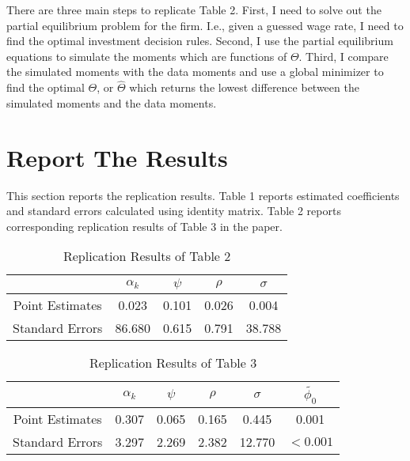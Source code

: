 \documentclass[letterpaper,12pt]{article}
\theoremstyle{definition}
\begin{document}
There are three main steps to replicate Table 2. First, I need to solve out the partial equilibrium problem for the firm. I.e., given a guessed wage rate, I need to find the optimal investment decision rules. Second, I use the partial equilibrium equations to simulate the moments which are functions of $ \Theta $. Third, I compare the simulated moments with the data moments and use a global minimizer to find the optimal $ \Theta $, or $ \hat{\Theta}$ which returns the lowest difference between the simulated moments and the data moments.


\section{Report The Results}

This section reports the replication results. Table 1 reports estimated coefficients and standard errors calculated using identity matrix. Table 2 reports corresponding replication results of Table 3 in the paper.

\begin{table}[h]
	\centering
	\caption{Replication Results of Table 2}
	\begin{tabular}{|c|c|c|c|c|}
		\hline
		                & $ \alpha_k $ & $ \psi $ & $ \rho $ & $ \sigma $ \\ \hline
		Point Estimates & 0.023 & 0.101 & 0.026 & 0.004 \\ \hline
		Standard Errors & 86.680 & 0.615 & 0.791 & 38.788 \\
		\hline
	\end{tabular}
\end{table}

\begin{table}[h]
	\centering
	\caption{Replication Results of Table 3}
	\begin{tabular}{|c|c|c|c|c|c|}
		\hline
		& $ \alpha_k $ & $ \psi $ & $ \rho $ & $ \sigma $ & $ \tilde{\phi_0} $ \\ \hline
		Point Estimates & 0.307 & 0.065 & 0.165 & 0.445 & 0.001 \\ \hline
		Standard Errors & 3.297 & 2.269 & 2.382 & 12.770 & $ <0.001 $ \\
		\hline
	\end{tabular}
\end{table}
\end{document}
